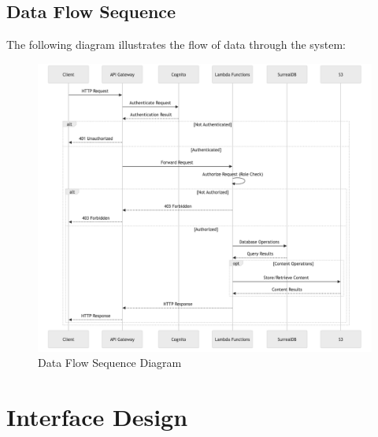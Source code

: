 \documentclass[a4paper, 11pt]{scrreprt}
\begin{document}
\section{Data Flow Sequence}
The following diagram illustrates the flow of data through the system:

\begin{figure}[ht]
    \centering
    \includegraphics[width=\textwidth]{data_flow.png}
    \caption{Data Flow Sequence Diagram}
\end{figure}

\chapter{Interface Design}
\end{document}
